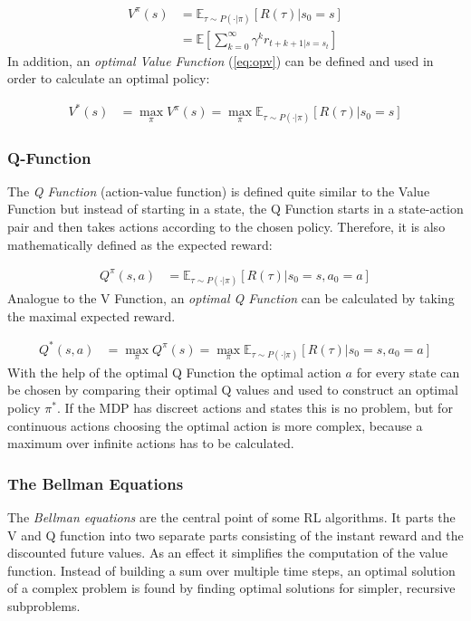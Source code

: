 \begin{align}
	V^{\pi}(s) &= \mathbb{E}_{\tau \sim P(\cdot|\pi)}[R(\tau)|s_0=s] \\
	&= \mathbb{E}[\sum_{k=0}^{\infty}\gamma^k r_{t+k+1|s=s_t}]
\end{align}
\newline
In addition, an \emph{optimal Value Function} (\cref{eq:opv}) can be defined and used in order to calculate an optimal policy:

\begin{align}\label{eq:opv}
	V^*(s) &= \max_{\pi} V^{\pi}(s)
	= \max_{\pi} \mathbb{E}_{\tau \sim P(\cdot|\pi)}[R(\tau)|s_0=s]
\end{align} 

\subsubsection{Q-Function} \label{sec:Q}
The \emph{Q Function} (action-value function) is defined quite similar to the Value Function but instead of starting in a state, 
the Q Function starts in a state-action pair and then takes actions according to the chosen policy. Therefore, it is also mathematically defined as the expected reward:

\begin{align}
	Q^{\pi}(s,a) &= \mathbb{E}_{\tau \sim P(\cdot|\pi)}[R(\tau)|s_0=s, a_0=a]
\end{align}
\newline
Analogue to the V Function, an \emph{optimal Q Function} can be calculated by taking the maximal expected reward.

\begin{align} \label{eq:opq}
	Q^*(s,a) &= \max_{\pi} Q^{\pi}(s)
	= \max_{\pi} \mathbb{E}_{\tau \sim P(\cdot|\pi)}[R(\tau)|s_0=s, a_0=a]
\end{align}
\newline
With the help of the optimal Q Function the optimal action $a$ for every state can be chosen by comparing 
their optimal Q values and used to construct an optimal policy $\pi^*$. 
If the MDP has discreet actions and states this is no problem, but 
for continuous actions choosing the optimal action is more complex, because
a maximum over infinite actions has to be calculated.

\newpage

\subsubsection{The Bellman Equations}
The \emph{Bellman equations} are the central point of some RL algorithms. It parts the V and Q function into two
separate parts consisting of the instant reward and the discounted future values. As an effect it simplifies the computation of the value function. 
Instead of building a sum over multiple time steps, an optimal solution of a complex problem is found by finding optimal solutions for simpler, recursive subproblems.


